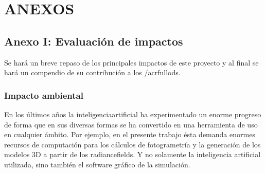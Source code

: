 \documentclass[a4paper, 12pt, spanish, twoside]{article}
\begin{document}
\newpage

\section*{ANEXOS} \label{sec:anexos} %

\renewcommand{\thesubsection}{\Alph{subsection}} %
\renewcommand{\thetable}{\Alph{subsection}.\arabic{table}}
\renewcommand{\thefigure}{\Alph{subsection}.\arabic{figure}}
\renewcommand{\thecode}{\Alph{subsection}.\arabic{code}}


\subsection{Anexo I: Evaluación de impactos} \label{sec:anexo1} 

Se hará un breve repaso de los principales impactos de este proyecto y al final se hará un compendio de su contribución a los /acrfull{ods}. 


\subsubsection{Impacto ambiental} \label{sec:anexo1:ambiental} 

En los últimos años la \gls{inteligenciaartificial} ha experimentado un enorme progreso de forma que en sus diversas formas se ha convertido en una herramienta de uso en cualquier ámbito. Por ejemplo, en el presente trabajo ésta demanda enormes recursos de computación para los cálculos de fotogrametría y la generación de los modelos 3D a partir de los \glspl{radiancefield}. Y no solamente la inteligencia artificial utilizada, sino también el software gráfico de la simulación. 
\end{document}

